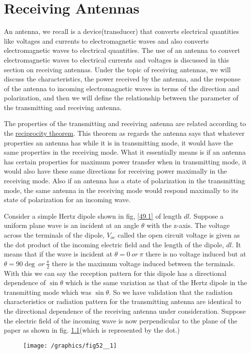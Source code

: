 \chapter{Receiving Antennas}
An antenna, we recall is a device(transducer) that converts electrical quantities like voltages and currents to electromagnetic waves and also converts electromagnetic waves to electrical quantities. The use of an antenna to convert electromagnetic waves to electrical currents and voltages is discussed in this section on receiving antennas. Under the topic of receiving antennas, we will discuss the characteristics, the power received by the antenna, and the response of the antenna to incoming electromagnetic waves in terms of the direction and polarization, and then we will define the relationship between the parameter of the transmitting and receiving antenna.

The properties of the transmitting and receiving antenna are related according to the \underline{reciprocity theorem}. This theorem as regards the antenna says that whatever properties an antenna has while it is in transmitting mode, it would have the same properties in the receiving mode. What it essentially means is if an antenna has certain properties for maximum power transfer when in transmitting mode, it would also have these same directions for receiving power maximally in the receiving mode. Also if an antenna has a state of polarization in the transmitting mode, the same antenna in the receiving mode would respond maximally to its state of polarization for an incoming wave.

Consider a simple Hertz dipole shown in fig, \ref{49.1} of length $dl$. Suppose a uniform plane wave is an incident at an angle $\theta$ with the z-axis. The voltage across the terminals of the dipole, $V_{oc}$ called the open circuit voltage is given as the dot product of the incoming electric field and the length of the dipole, $dl$. It means that if the wave is incident at $\theta = 0\ or\ \pi$ there is no voltage induced but at $\theta = 90\deg\ or\ \frac{\pi}{2}$ there is the maximum voltage induced between the terminals. With this we can say the reception pattern for this dipole has a directional dependence of $\sin\theta$ which is the same variation as that of the Hertz dipole in the transmitting mode which was $\sin\theta$. So we have validation that the radiation characteristics or radiation pattern for the transmitting antenna are identical to the directional dependence of the receiving antenna under consideration. Suppose the electric field of the incoming wave is now perpendicular to the plane of the paper as shown in fig. \ref{49.2}(which is represented by the dot.)
\begin{figure}[h]
\centering
\texttt{[image: /graphics/fig52\_\_1]}
\caption{}
\label{49.2}
\end{figure}

